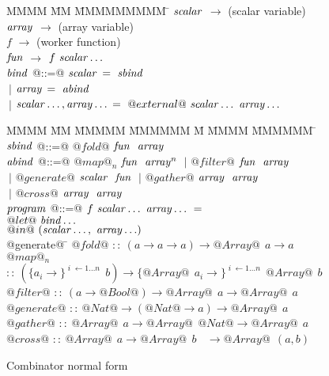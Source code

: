 \begin{figure}
\begin{tabbing}
MMMM        \= MM \= MMMMMMMMM \= \kill
$\mathit{scalar}$    \> $\to$ \> (scalar variable) \\
$\mathit{array}$     \> $\to$ \> (array variable)  \\
$f$         \> $\to$ \> (worker function) \\
$\mathit{fun}$       \> $\to$ \> $f~\mathit{scalar}\ldots$
\\[2ex]
$\mathit{bind}$      \> @::=@ \> $\mathit{scalar}$ \> $=~\mathit{sbind}$ \\
            \> $~|$  \> $\mathit{array}$  \> $=~\mathit{abind}$ \\
            \> $~|$  \> $\mathit{scalar}\ldots,\mathit{array}\ldots$ \> $=~@external@~\mathit{scalar}\ldots~\mathit{array}\ldots$
\end{tabbing}

\begin{tabbing}
MMMM        \= MM \= MMMMM \= MMMMMM \= M \= MMMM \= MMMMMM \= \kill
$\mathit{sbind}$     \> @::=@ \> $@fold@$     \> $\mathit{fun}~~ \mathit{array}$
\\[1ex]

$\mathit{abind}$     \> @::=@ \> $@map@_n$    \> $\mathit{fun}~~ \mathit{array}^n$ 
            \> $~|$  \> $@filter@$   \> $\mathit{fun}~~ \mathit{array}$   \\
            \> $~|$  \> $@generate@$ \> $\mathit{scalar}~~ \mathit{fun}$  
            \> $~|$  \> $@gather@$   \> $\mathit{array}~~ \mathit{array}$ \\
            \> $~|$  \> $@cross@$    \> $\mathit{array}~~ \mathit{array}$
\\[1ex]
$\mathit{program}$  \> @::=@ \> $f~\mathit{scalar}\ldots~\mathit{array}\ldots~=$ \\
            \>          \> $@let@~\mathit{bind}\ldots$                  \\
            \>          \> $@in@~(\mathit{scalar}\ldots,~\mathit{array}\ldots)$
\\[5ex]
@generate@ \= \kill
$@fold@$     \> $::~ (a \to a \to a) \to @Array@~~ a \to a$     \\
$@map@_n$    \> $::~ (\{a_i          \to\}^{\;i\; \gets 1 \dots n}~~ b)  \to
                       \{@Array@~~ a_i \to\}^{\;i\; \gets 1 \dots n}~~ @Array@~~ b$ \\
$@filter@$   \> $::~ (a \to @Bool@) \to @Array@~~ a \to @Array@~~ a$      \\
$@generate@$ \> $::~ @Nat@ \to (@Nat@ \to a) \to @Array@~~ a$          \\
$@gather@$   \> $::~ @Array@~~ a \to @Array@~~ @Nat@  \to @Array@~~ a$ \\
$@cross@$    \> $::~ @Array@~~ a \to @Array@~~ b ~~~~ \to @Array@~~ (a, b)$
\end{tabbing}
\caption{Combinator normal form}
\label{clustering:f:CombinatorNormalForm}
\end{figure}

